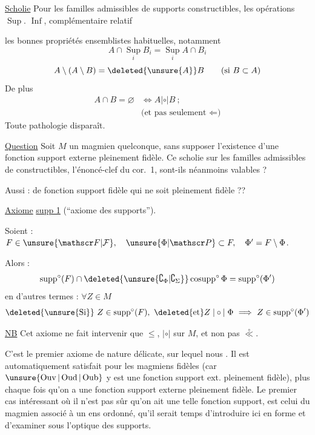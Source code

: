 \uline{Scholie} Pour les familles admissibles de supports constructibles, les opérations $\operatorname{Sup}.$ $\operatorname{Inf}$, complémentaire relatif 
\clearpage
{}

les bonnes propriétés  ensemblistes habituelles, notamment
\[
A\cap\operatorname*{Sup}_i B_i=\operatorname*{Sup}_i A\cap B_i
\]
\[
A\setminus(A\setminus B)=\deleted{\unsure{A}}B\qquad(\text{si }B\subset A)
\]
De plus 
\[
\begin{aligned}
A\cap B=\varnothing&\Longleftrightarrow A\mathrel{|\circ|}B\ ;\\
&\text{(et pas seulement }\Leftarrow\text{)}
\end{aligned}
\]
Toute pathologie disparaît.

\uline{Question} Soit $M$ un magmien quelconque, sans supposer l'existence d'une fonction support externe pleinement fidèle. Ce scholie sur les familles admissibles de  constructibles,   l'énoncé-clef du cor.\ 1, sont-ils néanmoins valables ?

Aussi :  de fonction support fidèle qui ne soit pleinement fidèle ??

\uline{Axiome} \uline{ supp 1} (``axiome des supports'').

\noindent\vrule\hspace{0.15em}\vrule\hspace{0.6em}\begin{minipage}{0.92\linewidth}
Soient : $F\in\unsure{\mathscr F|\mathcal F},\quad\unsure{\Phi|\mathscr P}\subset F,\quad\Phi'=F\setminus\Phi$.

Alors :
\[
\operatorname{supp}^{\circ}(F)\cap\deleted{\unsure{\complement_{\Phi}|\complement_{\Sigma}}}\operatorname{cosupp}^{\circ}\Phi=\operatorname{supp}^{\circ}(\Phi')
\]
en d'autres termes : $\forall Z\in M$
\[
\deleted{\unsure{\text{Si}}}\ Z\in\operatorname{supp}^{\circ}(F),\ \deleted{\text{et}}Z\mathrel{|\circ|}\Phi\ \Longrightarrow\ Z\in\operatorname{supp}^{\circ}(\Phi')
\]
\end{minipage}

\uline{NB} Cet axiome ne fait intervenir que $\leq$, $|\circ|$ sur $M$, et non pas $\overset{\circ}{\ll}$.
\clearpage
{}

C'est le premier axiome de nature délicate, sur lequel nous . Il est automatiquement satisfait pour les magmiens fidèles (car $\unsure{\operatorname{Ouv}|\operatorname{Oud}|\operatorname{Oub}}$ y est une fonction support ext. pleinement fidèle), plus  chaque fois qu'on a une fonction support externe pleinement fidèle. Le premier cas intéressant où il n'est pas sûr qu'on ait une telle fonction support, est celui du magmien associé à un ens ordonné, qu'il serait temps d'introduire ici en forme et d'examiner sous l'optique des supports.

